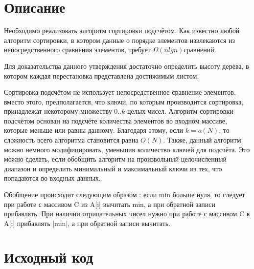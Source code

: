 \section{Описание}
Необходимо реализовать алгоритм сортировки подсчётом. Как известно любой алгоритм сортировки, в котором данные о порядке элементов извлекаются из непосредственного сравнения элементов, требует 
$\Omega(n lg n) сравнений$. 
\begin{displayquote}
	Для доказательства данного утверждения достаточно определить высоту дерева, в котором каждая перестановка представлена достижимым листом.\cite{Kormen}
\end{displayquote}
Сортировка подсчётом не использует непосредственное сравнение элементов, вместо этого, предполагается, что ключи, по которым производится сортировка, принадлежат некоторому множеству ${0..k}$ целых чисел. Алгоритм сортировки подсчётом основан на подсчёте количества элементов во входном массиве, которые меньше или равны данному. Благодаря этому, если $k = o(N)$, то сложность всего алгоритма становится равна $O(N)$. Также, данный алгоритм можно немного модифицировать, уменьшив количество ключей для подсчёта. Это можно сделать, если обобщить алгоритм на произвольный целочисленный диапазон и определить минимальный и максимальный ключи из тех, что попадаются во входных данных. 
\begin{displayquote}
Обобщение происходит следующим образом : если min больше нуля, то следует при работе с массивом C из A[i] вычитать min, а при обратной записи прибавлять. При наличии отрицательных чисел нужно при работе с массивом C к A[i] прибавлять |min|, а при обратной записи вычитать.\cite{wikipedia_sort}
\end{displayquote}

\pagebreak

\section{Исходный код}

